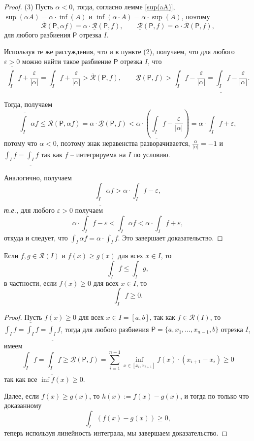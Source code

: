 \begin{proof}
(3) Пусть $\alpha <0$, тогда, согласно лемме \ref{sup(aA)}, $\sup(\alpha A) = \alpha \cdot \inf(A)$ и $\inf(\alpha \cdot A) = \alpha \cdot \sup(A)$, поэтому
\[
 \overline{\mathcal{R}}(\mathsf{P}, \alpha f) = \alpha \cdot \underline{\mathcal{R}}(\mathsf{P}, f), \qquad \underline{\mathcal{R}}(\mathsf{P},  f) = \alpha \cdot \overline{\mathcal{R}}(\mathsf{P}, f),
\]
для любого разбиения $\mathsf{P}$ отрезка $I.$

Используя те же рассуждения, что и в пункте (2), получаем, что для любого $\varepsilon>0$ можно найти такое разбиение $\mathsf{P}$ отрезка $I$, что 
\[
  \overline{\int_I}f + \frac{\varepsilon}{|\alpha|} = \int_I f + \frac{\varepsilon}{|\alpha|} > \overline{\mathcal{R}}(\mathsf{P},f), \qquad \underline{\mathcal{R}}(\mathsf{P},f) > \int_I f - \frac{\varepsilon}{|\alpha|} = \underline{\int_I}f - \frac{\varepsilon}{|\alpha|}.
\]

Тогда, получаем
\[
 \overline{\int_I}\alpha f \le \overline{\mathcal{R}}(\mathsf{P},\alpha f) = \alpha\cdot \underline{\mathcal{R}}(\mathsf{P},f) < \alpha \cdot \left( \underline{\int_I}f - \frac{\varepsilon}{|\alpha|} \right) = \alpha \cdot \int_I f + \varepsilon,
\]
потому что $\alpha<0$, поэтому знак неравенства разворачивается, $\frac{\alpha}{|\alpha|} = -1$ и $\int_I f = \underline{\int_I}f$ так как $f$ -- интегрируема на $I$ по условию.

Аналогично, получаем
\[
 \underline{\int_I} \alpha f> \alpha \cdot \int_I f - \varepsilon,
\]
\textit{т.е.,} для любого $\varepsilon>0$ получаем
\[
 \alpha \cdot \int_I f - \varepsilon < \int_I \alpha f < \alpha \cdot \int_I f + \varepsilon,
\]
откуда и следует, что $\int_I \alpha f = \alpha \cdot \int_I f.$ Это завершает доказательство.
\end{proof}

\begin{corollary}\label{int>0}
 Если $f,g \in \mathscr{R}(I)$ и $f(x) \ge g(x)$ для всех $x \in I$, то
    \[
     \int_I f \le \int_I g,
    \]
    в частности, если $f(x) \ge 0$ для всех $x \in I$, то
    \[
     \int_I f \ge 0.
    \]
\end{corollary}
\begin{proof}
 Пусть $f(x) \ge 0$ для всех $x \in I = [a,b]$, так как $f\in \mathscr{R}(I)$, то $\int_I f = \overline{\int_I}f = \underline{\int_I}f$, тогда для любого разбиения $\mathsf{P} = \{a,x_1,\ldots, x_{n-1},b\}$ отрезка $I$, имеем
 \[
  \int_I f = \underline{\int_I} f \ge \underline{\mathcal{R}}(\mathsf{P},f) = \sum_{i=1}^{n-1} \inf_{x \in [x_i,x_{i+1}]} f(x) \cdot (x_{i+1}-x_i) \ge  0
 \]
 так как все $\inf f(x) \ge 0$.

 Далее, если $f(x) \ge g(x)$, то $h(x):=f(x) - g(x)$, и тогда по только что доказанному 
 \[
  \int_I(f(x) -g(x)) \ge 0,
 \]
 теперь используя линейность интеграла, мы завершаем доказательство.
\end{proof}



